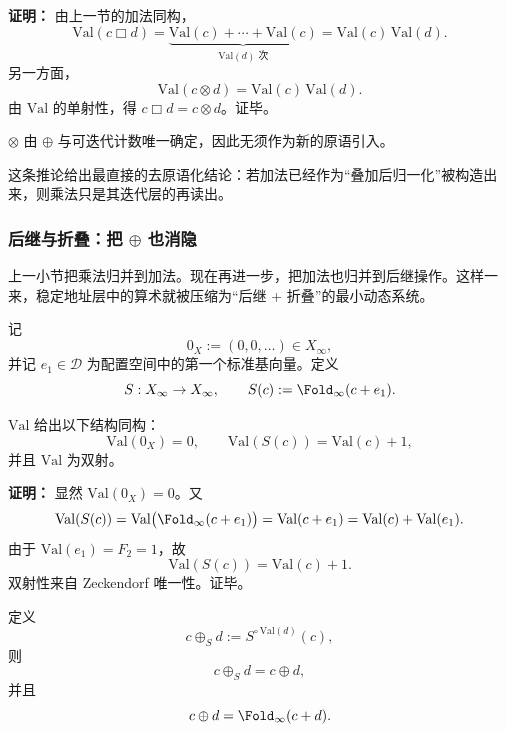 \textbf{证明：}
由上一节的加法同构，
\[
\mathrm{Val}(c\mathbin{\Box} d)
=
\underbrace{\mathrm{Val}(c)+\cdots+\mathrm{Val}(c)}_{\mathrm{Val}(d)\text{ 次}}
=\mathrm{Val}(c)\,\mathrm{Val}(d).
\]
另一方面，
\[
\mathrm{Val}(c\otimes d)=\mathrm{Val}(c)\,\mathrm{Val}(d).
\]
由 \(\mathrm{Val}\) 的单射性，得 \(c\mathbin{\Box} d=c\otimes d\)。证毕。

\begin{corollary}[“合并”的第一种严格版本]\label{cor:mul-no-new-primitive}
\(\otimes\) 由 \(\oplus\) 与可迭代计数唯一确定，因此无须作为新的原语引入。
\end{corollary}

这条推论给出最直接的去原语化结论：若加法已经作为“叠加后归一化”被构造出来，则乘法只是其迭代层的再读出。

\subsubsection{后继与折叠：把 \texorpdfstring{$\oplus$}{oplus} 也消隐}\label{subsec:succ-and-fold}
上一小节把乘法归并到加法。现在再进一步，把加法也归并到后继操作。这样一来，稳定地址层中的算术就被压缩为“后继 + 折叠”的最小动态系统。

\begin{definition}[后继与折叠]\label{def:successor-fold}
记
\[
0_X:=(0,0,\dots)\in X_\infty,
\]
并记 \(e_1\in\mathcal D\) 为配置空间中的第一个标准基向量。定义
\[
S:X_\infty\to X_\infty,\qquad
S(c):=\Fold_\infty(c+e_1).
\]
\end{definition}

\begin{theorem}[后继结构同构]\label{thm:successor-structure}
\(\mathrm{Val}\) 给出以下结构同构：
\[
\mathrm{Val}(0_X)=0,\qquad
\mathrm{Val}(S(c))=\mathrm{Val}(c)+1,
\]
并且 \(\mathrm{Val}\) 为双射。
\end{theorem}

\textbf{证明：}
显然 \(\mathrm{Val}(0_X)=0\)。又
\[
\mathrm{Val}(S(c))
=\mathrm{Val}\bigl(\Fold_\infty(c+e_1)\bigr)
=\mathrm{Val}(c+e_1)
=\mathrm{Val}(c)+\mathrm{Val}(e_1).
\]
由于 \(\mathrm{Val}(e_1)=F_2=1\)，故
\[
\mathrm{Val}(S(c))=\mathrm{Val}(c)+1.
\]
双射性来自 Zeckendorf 唯一性。证毕。

\begin{corollary}[加法由后继迭代给出]\label{cor:add-from-successor}
定义
\[
c\oplus_S d:=S^{\circ\,\mathrm{Val}(d)}(c),
\]
则
\[
c\oplus_S d=c\oplus d,
\]
并且
\[
c\oplus d=\Fold_\infty(c+d).
\]
\end{corollary}

